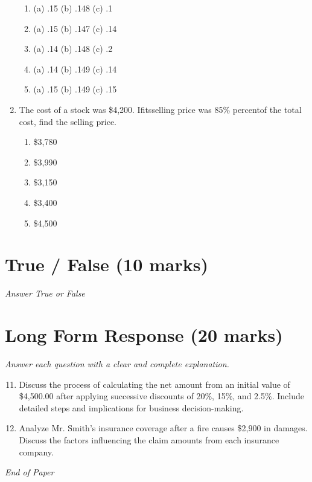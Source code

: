 \documentclass[12pt]{article}
\begin{document}
\begin{enumerate}[label=\arabic*.]
\begin{enumerate}[label=(\alph*)]
    \item (a) .15 (b) .148 (c) .1
    \item (a) .15 (b) .147 (c) .14
    \item (a) .14 (b) .148 (c) .2
    \item (a) .14 (b) .149 (c) .14
    \item (a) .15 (b) .149 (c) .15
\end{enumerate}
\item The cost of a stock was \$4,200. Ifitsselling price was 85\% percentof the total cost, find the selling price.
\begin{enumerate}[label=(\alph*)]
    \item \$3,780
    \item \$3,990
    \item \$3,150
    \item \$3,400
    \item \$4,500
\end{enumerate}
\end{enumerate}

\section*{True / False (10 marks)}
\textit{Answer True or False}

\section*{Long Form Response (20 marks)}
\textit{Answer each question with a clear and complete explanation.}
\begin{enumerate}[label=\arabic*.]
\setcounter{enumi}{10}
\item Discuss the process of calculating the net amount from an initial value of \$4,500.00 after applying successive discounts of 20\%, 15\%, and 2.5\%. Include detailed steps and implications for business decision-making.
\item Analyze Mr. Smith's insurance coverage after a fire causes \$2,900 in damages. Discuss the factors influencing the claim amounts from each insurance company.
\end{enumerate}

\vfill
\noindent\textit{End of Paper}
\end{document}
